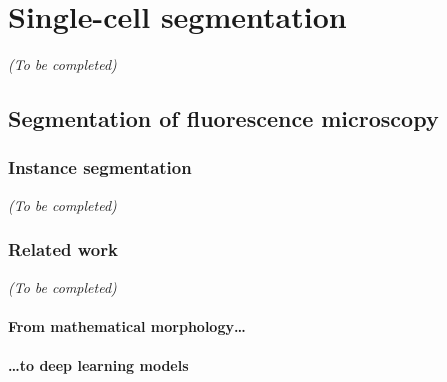
\graphicspath{{./figures/chapter3/}}


\chapter{Single-cell segmentation}
\label{ch:chapter3}

\minitoc
\newpage

\begin{center}
	\textit{(To be completed)}
\end{center}

\section{Segmentation of fluorescence microscopy}
\label{sec:segmentation_introduction}

\subsection{Instance segmentation}
\label{subsec:segmentation_instance_introduction}

\begin{center}
	\textit{(To be completed)}
\end{center}

\subsection{Related work}
\label{subsec:segmentation_related_work}

\begin{center}
	\textit{(To be completed)}
\end{center}


\subsubsection{From mathematical morphology\dots}

\subsubsection{\dots to deep learning models}


